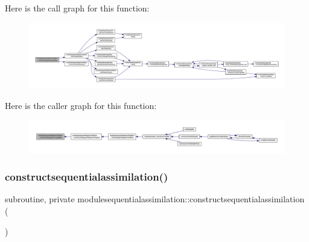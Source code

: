 Here is the call graph for this function\+:\nopagebreak
\begin{figure}[H]
\begin{center}
\leavevmode
\includegraphics[width=350pt]{namespacemodulesequentialassimilation_adb290ebd31525621b87da4ea0f2c443c_cgraph}
\end{center}
\end{figure}
Here is the caller graph for this function\+:\nopagebreak
\begin{figure}[H]
\begin{center}
\leavevmode
\includegraphics[width=350pt]{namespacemodulesequentialassimilation_adb290ebd31525621b87da4ea0f2c443c_icgraph}
\end{center}
\end{figure}
\mbox{\label{namespacemodulesequentialassimilation_a3da335c8c675b830ec8be82762a0bb61}} 
\subsubsection{\texorpdfstring{constructsequentialassimilation()}{constructsequentialassimilation()}}
{\footnotesize\ttfamily subroutine, private modulesequentialassimilation\+::constructsequentialassimilation (\begin{DoxyParamCaption}{ }\end{DoxyParamCaption})\hspace{0.3cm}{\ttfamily [private]}}

